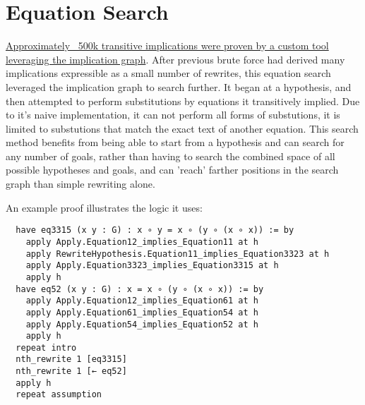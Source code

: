 \chapter{Equation Search}

\href{https://github.com/teorth/equational_theories/tree/main/equational_theories/Generated/EquationSearch}{Approximately ~500k transitive implications were proven by a custom tool leveraging the implication graph}. After previous brute force had derived many implications expressible as a small number of rewrites, this equation search leveraged the implication graph to search further. It began at a hypothesis, and then attempted to perform substitutions by equations it transitively implied. Due to it's naive implementation, it can not perform all forms of substutions, it is limited to substutions that match the exact text of another equation. This search method benefits from being able to start from a hypothesis and can search for any number of goals, rather than having to search the combined space of all possible hypotheses and goals, and can 'reach' farther positions in the search graph than simple rewriting alone.

An example proof illustrates the logic it uses:

\begin{verbatim}
  have eq3315 (x y : G) : x ∘ y = x ∘ (y ∘ (x ∘ x)) := by
    apply Apply.Equation12_implies_Equation11 at h
    apply RewriteHypothesis.Equation11_implies_Equation3323 at h
    apply Apply.Equation3323_implies_Equation3315 at h
    apply h
  have eq52 (x y : G) : x = x ∘ (y ∘ (x ∘ x)) := by
    apply Apply.Equation12_implies_Equation61 at h
    apply Apply.Equation61_implies_Equation54 at h
    apply Apply.Equation54_implies_Equation52 at h
    apply h
  repeat intro
  nth_rewrite 1 [eq3315]
  nth_rewrite 1 [← eq52]
  apply h
  repeat assumption
\end{verbatim}
